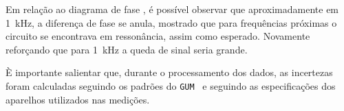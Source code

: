   Em relação ao diagrama de fase , é possível observar que aproximadamente em \SI{1}{\kilo\hertz}, a diferença de fase se anula, mostrado que para frequências próximas o circuito se encontrava em ressonância, assim como esperado. Novamente reforçando que para \SI{1}{\kilo\hertz} a queda de sinal seria grande.

  È importante salientar que, durante o processamento dos dados, as incertezas foram calculadas seguindo os padrões do \texttt{GUM}~\cite{ref:gum} e seguindo as especificações dos aparelhos utilizados nas medições.